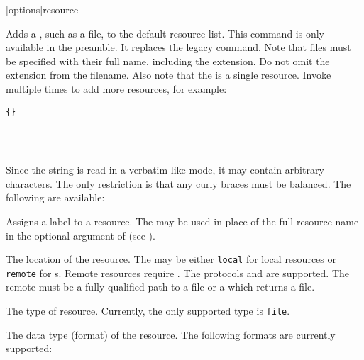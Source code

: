 \begin{ltxsyntax}

[options]{resource}

Adds a , such as a  file, to the default resource list. This command is only available in the preamble. It replaces the  legacy command. Note that files must be specified with their full name, including the extension. Do not omit the  extension from the filename. Also note that the  is a single resource. Invoke  multiple times to add more resources, for example:

\begin{lstlisting}[style=latex]{}




\end{lstlisting}
%
Since the  string is read in a verbatim-like mode, it may contain arbitrary characters. The only restriction is that any curly braces must be balanced. The following  are available:

\begin{optionlist*}


Assigns a label to a resource. The  may be used in place of the full resource name in the optional argument of  (see ).


The location of the resource. The  may be either \texttt{local} for local resources or \texttt{remote} for s. Remote resources require \biber. The protocols  and  are supported. The remote  must be a fully qualified path to a  file or a  which returns a  file.


The type of resource. Currently, the only supported type is \texttt{file}.


The data type (format) of the resource. The following formats are currently supported:

\begin{valuelist}[zoterordfxml]


\end{valuelist}
\end{optionlist*}
\end{ltxsyntax}
